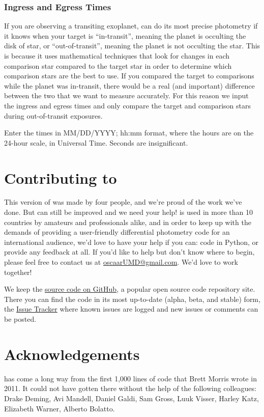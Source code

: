 \documentclass[a4paper]{article}
\begin{document}
\subsubsection{Ingress and Egress Times}
If you are observing a transiting exoplanet, \oscaar can do its most precise photometry if it knows when your target is ``in-transit'', meaning the planet is occulting the disk of star, or ``out-of-transit'', meaning the planet is not occulting the star. This is because it uses mathematical techniques that look for changes in each comparison star compared to the target star in order to determine which comparison stars are the best to use. If you compared the target to comparisons while the planet was in-transit, there would be a real (and important) difference between the two that we want to measure accurately. For this reason we input the ingress and egress times and only compare the target and comparison stars during out-of-transit exposures.

Enter the times in MM/DD/YYYY;  hh:mm format, where the hours are on the 24-hour scale, in Universal Time. Seconds are insignificant.



\section{Contributing to \oscaar}
This version of \oscaar was made by four people, and we're proud of the work we've done. But \oscaar can still be improved and we need your help! \oscaar is used in more than 10 countries by amateurs and professionals alike, and in order to keep up with the demands of providing a user-friendly differential photometry code for an international audience, we'd love to have your help if you can: code in Python, or provide any feedback at all. If you'd like to help but don't know where to begin, please feel free to contact us at \href{mailto:oscaarUMD@gmail.com}{oscaarUMD@gmail.com}. We'd love to work together! 

We keep the \href{https://github.com/OSCAAR/OSCAAR}{source code on GitHub}, a popular open source code repository site. There you can find the code in its most up-to-date (alpha, beta, and stable) form, the \href{https://github.com/OSCAAR/OSCAAR/issues?state=open}{Issue Tracker} where known issues are logged and new issues or comments can be posted.




\section{Acknowledgements}
\oscaar has come a long way from the first 1,000 lines of code that Brett Morris wrote in 2011. It could not have gotten there without the help of the following colleagues: 
Drake Deming, Avi Mandell, Daniel Galdi, Sam Gross, Luuk Visser, Harley Katz, Elizabeth Warner, Alberto Bolatto.

	
\end{document}

